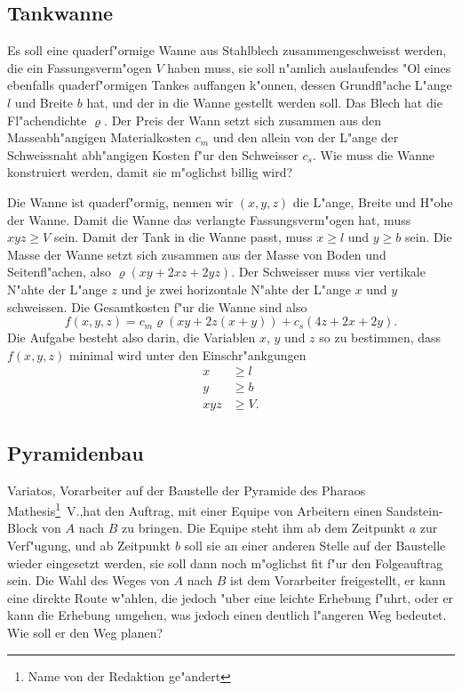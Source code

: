 \subsection{Tankwanne\label{uebersicht:wanne}}
Es soll eine quaderf"ormige Wanne aus Stahlblech zusammengeschweisst
werden, die ein Fassungsverm"ogen $V$ haben muss, sie soll n"amlich
auslaufendes "Ol eines ebenfalls quaderf"ormigen Tankes auffangen k"onnen,
dessen Grundfl"ache L"ange $l$ und Breite $b$ hat, und der in die
Wanne gestellt werden soll.
Das Blech hat die Fl"achendichte $\varrho$. Der Preis der Wann setzt sich
zusammen aus den Masseabh"angigen Materialkosten $c_m$ und den allein
von der L"ange der Schweissnaht abh"angigen Kosten f"ur den Schweisser
$c_s$. Wie muss die Wanne konstruiert werden, damit sie m"oglichst 
billig wird?

Die Wanne ist quaderf"ormig, nennen wir $(x,y,z)$ die L"ange, Breite
und H"ohe der Wanne. Damit die Wanne das verlangte
Fassungsverm"ogen hat, muss $xyz\ge V$ sein.
Damit der Tank in die Wanne passt, muss $x\ge l$ und $y\ge b$ sein.
Die Masse der Wanne setzt sich zusammen aus der Masse von Boden
und Seitenfl"achen, also
$\varrho(xy+2xz+2yz)$. Der Schweisser muss vier vertikale N"ahte
der L"ange $z$ und je zwei horizontale N"ahte der L"ange $x$ und $y$
schweissen. Die Gesamtkosten f"ur die Wanne sind also
\[
f(x,y,z)=c_m\varrho(xy+2z(x+y))+c_s(4z+2x+2y).
\]
Die Aufgabe besteht also darin, die Variablen $x$, $y$ und $z$ so
zu bestimmen, dass $f(x,y,z)$ minimal wird unter den Einschr"ankgungen
\begin{align*}
x&\ge l\\
y&\ge b\\
xyz&\ge V.
\end{align*}

\subsection{Pyramidenbau\label{uebersicht:pyramidenbau}}
Variatos, Vorarbeiter auf der Baustelle der Pyramide des Pharaos
Mathesis\footnote{Name von der Redaktion ge"andert}~V.,hat den Auftrag, mit
einer Equipe von Arbeitern einen Sandstein-Block von $A$ nach $B$
zu bringen. Die Equipe steht ihm ab dem Zeitpunkt $a$ zur Verf"ugung,
und ab Zeitpunkt $b$ soll sie an einer anderen Stelle auf der Baustelle
wieder eingesetzt werden, sie soll dann noch m"oglichst fit f"ur
den Folgeauftrag sein. Die Wahl des Weges von $A$ nach $B$ ist
dem Vorarbeiter freigestellt, er kann eine direkte Route w"ahlen, die
jedoch "uber eine leichte Erhebung f"uhrt, oder er kann die Erhebung
umgehen, was jedoch einen deutlich l"angeren Weg bedeutet. Wie soll
er den Weg planen?

